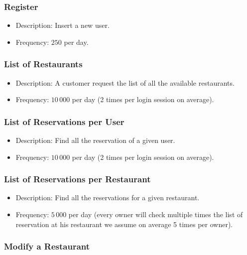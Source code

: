 \subsubsection{Register}

\begin{itemize}
	\item Description: Insert a new user.
	\item Frequency: \(250\) per day.
\end{itemize}

\subsubsection{List of Restaurants}

\begin{itemize}
	\item Description: A customer request the list of all the available
		restaurants.
	\item Frequency: \(10\,000\) per day (2 times per login session on
		average).
\end{itemize}

\subsubsection{List of Reservations per User}

\begin{itemize}
	\item Description: Find all the reservation of a given user.
	\item Frequency: \(10\,000\) per day (2 times per login session on
		average).
\end{itemize}

\subsubsection{List of Reservations per Restaurant}

\begin{itemize}
	\item Description: Find all the reservations for a given restaurant.
	\item Frequency: \(5\,000\) per day (every owner will check multiple times
		the list of reservation at his restaurant we assume on average 5
		times per owner).
\end{itemize}

\subsubsection{Modify a Restaurant}

